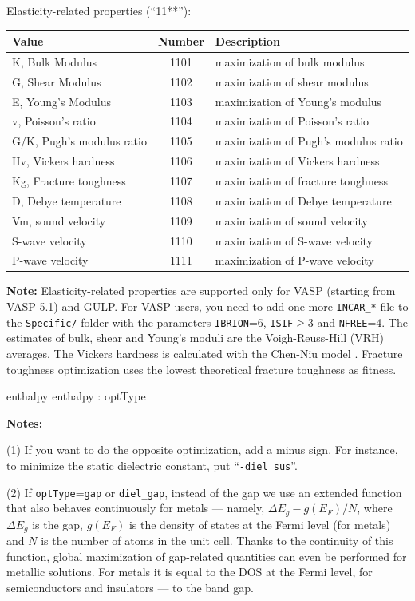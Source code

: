 \documentclass[12pt]{article}
\newcommand{\keyword}[1]{\texttt{#1}}
\newcommand{\file}[1]{\texttt{#1}}
\begin{document}
{Elasticity-related properties (``11**''):
\begin{center}
\begin{tabular}{|l|c|l|}
\hline
Value                     &Number& Description                                \\
\hline
K, Bulk Modulus           & 1101 & maximization of bulk modulus               \\
G, Shear Modulus          & 1102 & maximization of shear modulus              \\
E, Young's Modulus        & 1103 & maximization of Young's modulus            \\
v, Poisson's ratio        & 1104 & maximization of Poisson's ratio            \\
G/K, Pugh's modulus ratio & 1105 & maximization of Pugh's modulus ratio       \\
Hv, Vickers hardness      & 1106 & maximization of Vickers hardness           \\
Kg, Fracture toughness    & 1107 & maximization of fracture toughness         \\
D, Debye temperature      & 1108 & maximization of Debye temperature          \\
Vm, sound velocity        & 1109 & maximization of sound velocity             \\
S-wave velocity           & 1110 & maximization of S-wave velocity            \\
P-wave velocity           & 1111 & maximization of P-wave velocity            \\
\hline
\end{tabular}
\end{center}

\textbf{Note:} Elasticity-related properties are supported only for VASP
(starting from VASP 5.1) and GULP. For VASP users, you need to add one more
\file{INCAR\_*} file to the \file{Specific/} folder with the parameters
\keyword{IBRION}=6, \keyword{ISIF}$\geq$3 and \keyword{NFREE}=4. The estimates
of bulk, shear and Young's moduli are the Voigh-Reuss-Hill (VRH) averages. The
Vickers hardness is calculated with the Chen-Niu model \cite{Chen2011}. Fracture
toughness optimization uses the lowest theoretical fracture toughness as
fitness.}{enthalpy}{ enthalpy   :  optType}{\textbf{Notes:}

(1) If you want to do the opposite optimization, add a minus sign. For instance,
to minimize the static dielectric constant, put ``\texttt{-diel\_sus}''.

(2) If \keyword{optType}=\texttt{gap} or \texttt{diel\_gap}, instead of the gap
we use an extended function that also behaves continuously for metals ---
namely, $\Delta E_g - g(E_F)/N$, where $\Delta E_g$ is the gap, $g(E_F)$ is the
density of states at the Fermi level (for metals) and $N$ is the number of atoms
in the unit cell. Thanks to the continuity of this function, global maximization
of gap-related quantities can even be performed for metallic solutions. For
metals it is equal to the DOS at the Fermi level, for semiconductors and
insulators --- to the band gap.}
\end{document}

